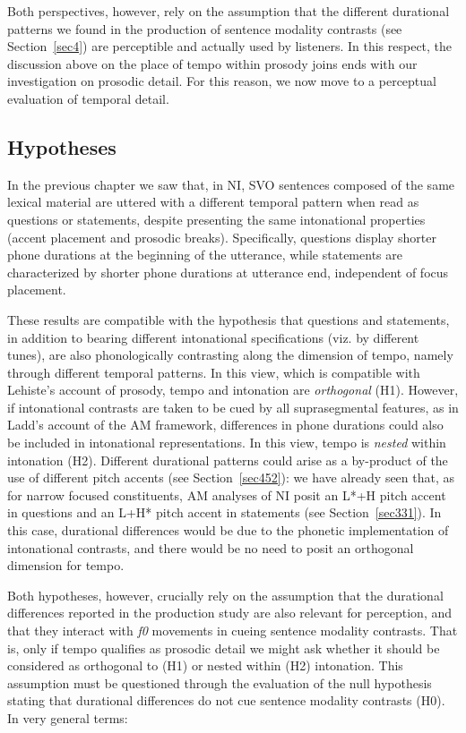 Both perspectives, however, rely on the assumption that the different durational patterns we found in the production of sentence modality contrasts (see Section~\ref{sec4}) are perceptible and actually used by listeners. In this respect, the discussion above on the place of tempo within prosody joins ends with our investigation on prosodic detail. For this reason, we now move to a perceptual evaluation of temporal detail.

\subsection{Hypotheses}\label{sec512}
In the previous chapter we saw that, in NI, SVO sentences composed of the same lexical material are uttered with a different temporal pattern when read as questions or statements, despite presenting the same intonational properties (accent placement and prosodic breaks). Specifically, questions display shorter phone durations at the beginning of the utterance, while statements are characterized by shorter phone durations at utterance end, independent of focus placement. 

These results are compatible with the hypothesis that questions and statements, in addition to bearing different intonational specifications (viz. by different tunes), are also phonologically contrasting along the dimension of tempo, namely through different temporal patterns. In this view, which is compatible with Lehiste's account of prosody, tempo and intonation are \textit{orthogonal} (H1). However, if intonational contrasts are taken to be cued by all suprasegmental features, as in Ladd's account of the AM framework, differences in phone durations could also be included in intonational representations. In this view, tempo is \textit{nested} within intonation (H2). Different durational patterns could arise as a by-product of the use of different pitch accents (see Section~\ref{sec452}): we have already seen that, as for narrow focused constituents, AM analyses of NI posit an L*+H pitch accent in questions and an L+H* pitch accent in statements (see Section~\ref{sec331}). In this case, durational differences would be due to the phonetic implementation of intonational contrasts, and there would be no need to posit an orthogonal dimension for tempo. 

Both hypotheses, however, crucially rely on the assumption that the durational differences reported in the production study are also relevant for perception, and that they interact with \textit{f0} movements in cueing sentence modality contrasts. That is, only if tempo qualifies as prosodic detail we might ask whether it should be considered as orthogonal to (H1) or nested within (H2) intonation. This assumption must be questioned through the evaluation of the null hypothesis stating that durational differences do not cue sentence modality contrasts (H0). In very general terms: 

